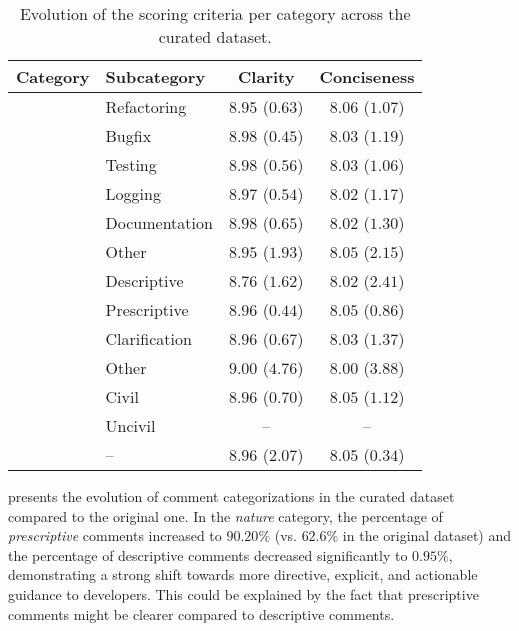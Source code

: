 \begin{table}[!t]
  \centering
  \caption{Evolution of the scoring criteria per category across the curated dataset.}
  \label{tab:cur_scoring_dist}
  \begin{tabular}{>{\centering\arraybackslash}p{1cm} >{\centering\arraybackslash}p{1.5cm}*{2}{c}}
    \toprule
    \textbf{Category} & \textbf{Subcategory} & \textbf{Clarity} & \textbf{Conciseness} \\
    \midrule
    \multirow{6}{*}{\textbf{Type}} & Refactoring & $8.95$ (\up $0.63$) & $8.06$ (\up $1.07$) \\
    & Bugfix & $8.98$ (\up $0.45$) & $8.03$ (\up $1.19$) \\
    & Testing & $8.98$ (\up $0.56$) & $8.03$ (\up $1.06$) \\
    & Logging & $8.97$ (\up $0.54$) & $8.02$ (\up $1.17$) \\
    & Documentation & $8.98$ (\up $0.65$) & $8.02$ (\up $1.30$) \\
    & Other & $8.95$ (\up $1.93$) & $8.05$ (\up $2.15$) \\
    \midrule
    \multirow{4}{*}{\textbf{Nature}} & Descriptive & $8.76$ (\up $1.62$) &  $8.02$ (\up $2.41$)\\
    & Prescriptive & $8.96$ (\up $0.44$) & $8.05$ (\up $0.86$) \\
    & Clarification & $8.96$ (\up $0.67$) & $8.03$ (\up $1.37$) \\
    & Other & $9.00$ (\up $4.76$) & $8.00$ (\up $3.88$) \\
    \midrule
    \multirow{2}{*}{\textbf{Civility}} & Civil & $8.96$ (\up $0.70$) & $8.05$ (\up $1.12$) \\
    & Uncivil & -- & -- \\
    \midrule
    \multirow{1}{*}{\textbf{Average}} & -- & $8.96$ (\up $2.07$)  & $8.05$ (\up $0.34$) \\
    \bottomrule
  \end{tabular}
  \vspace{-1em}
\end{table}


 presents the evolution of comment categorizations in the curated dataset compared to the original one. In the \emph{nature} category, the percentage of \emph{prescriptive} comments increased to $90.20\%$ (vs. $62.6\%$ in the original dataset) and the percentage of descriptive comments decreased significantly to $0.95\%$, demonstrating a strong shift towards more directive, explicit, and actionable guidance to developers. This could be explained by the fact that prescriptive comments might be clearer compared to descriptive comments.

